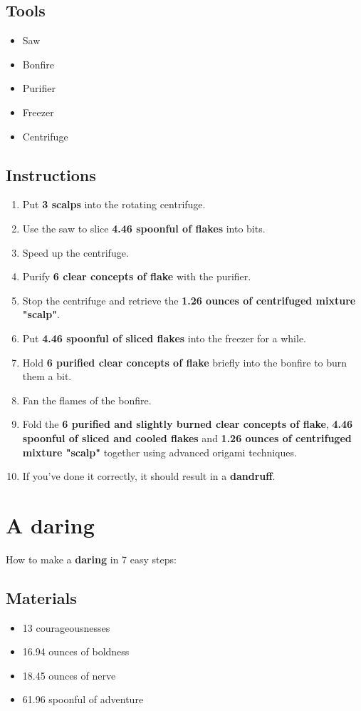 \documentclass{article}
\begin{document}
\subsection{Tools}\begin{itemize}
\item 
Saw
\item 
Bonfire
\item 
Purifier
\item 
Freezer
\item 
Centrifuge
\end{itemize}
\subsection{Instructions}\begin{enumerate}
\item 
Put \textbf{3 scalps} into the rotating centrifuge.
\item 
Use the saw to slice \textbf{4.46 spoonful of flakes} into bits.
\item 
Speed up the centrifuge.
\item 
Purify \textbf{6 clear concepts of flake} with the purifier.
\item 
Stop the centrifuge and retrieve the \textbf{1.26 ounces of centrifuged mixture "scalp"}.
\item 
Put \textbf{4.46 spoonful of sliced flakes} into the freezer for a while.
\item 
Hold \textbf{6 purified clear concepts of flake} briefly into the bonfire to burn them a bit.
\item 
Fan the flames of the bonfire.
\item 
Fold the \textbf{6 purified and slightly burned clear concepts of flake}, \textbf{4.46 spoonful of sliced and cooled flakes} and \textbf{1.26 ounces of centrifuged mixture "scalp"} together using advanced origami techniques.
\item 
If you've done it correctly, it should result in a \textbf{dandruff}.
\end{enumerate}
\newpage
\section{A daring}How to make a \textbf{daring} in 7 easy steps:

\subsection{Materials}\begin{itemize}
\item 
13 courageousnesses
\item 
16.94 ounces of boldness
\item 
18.45 ounces of nerve
\item 
61.96 spoonful of adventure
\end{itemize}
\end{document}
